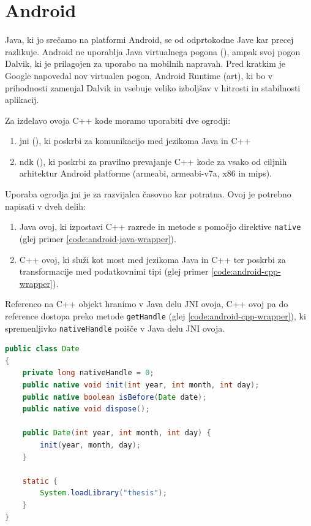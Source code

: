 \section{Android}

Java, ki jo srečamo na platformi Android, se od odprtokodne Jave kar precej razlikuje. Android ne uporablja Java virtualnega pogona (), ampak svoj pogon Dalvik, ki je prilagojen za uporabo na mobilnih napravah. Pred kratkim je Google napovedal nov virtualen pogon, Android Runtime (\gls{art}), ki bo v prihodnosti zamenjal Dalvik in vsebuje veliko izboljšav v hitrosti in stabilnosti aplikacij.

Za izdelavo ovoja C++ kode moramo uporabiti dve ogrodji:

\begin{enumerate}
  \item \gls{jni} (), ki poskrbi za komunikacijo med jezikoma Java in C++
  \item \gls{ndk} (), ki poskrbi za pravilno prevajanje C++ kode za vsako od ciljnih arhitektur Android platforme (armeabi, armeabi-v7a, x86 in mips).
\end{enumerate}

Uporaba ogrodja \gls{jni}\cite{jni-docs} je za razvijalca časovno kar potratna. Ovoj je potrebno napisati v dveh delih:

\begin{enumerate}
  \item Java ovoj, ki izpostavi C++ razrede in metode s pomočjo direktive \texttt{native} (glej primer \ref{code:android-java-wrapper}).
  \item C++ ovoj, ki služi kot most med jezikoma Java in C++ ter poskrbi za transformacije med podatkovnimi tipi (glej primer \ref{code:android-cpp-wrapper}).
\end{enumerate}

Referenco na C++ objekt hranimo v Java delu JNI ovoja, C++ ovoj pa do reference dostopa preko metode \texttt{getHandle} (glej \ref{code:android-cpp-wrapper}), ki spremenljivko \texttt{nativeHandle} poišče v Java delu JNI ovoja.

\begin{lstlisting}[caption={Primer Java ovoja C++ razreda \texttt{Date}.}, label=code:android-java-wrapper, language=Java]
public class Date
{
	private long nativeHandle = 0;
	public native void init(int year, int month, int day);
	public native boolean isBefore(Date date);
	public native void dispose();

	public Date(int year, int month, int day) {
		init(year, month, day);
	}

	static {
		System.loadLibrary("thesis");
	}
}
\end{lstlisting}

